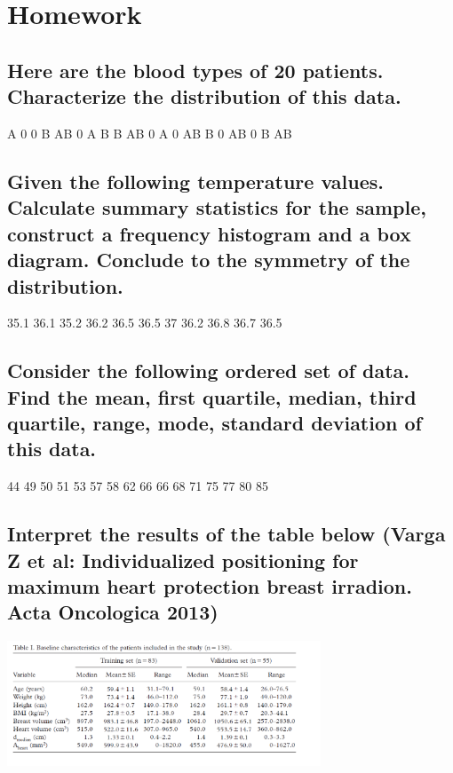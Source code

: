 \section{Homework}
\subsection{Here are the blood types of 20 patients. Characterize the distribution of this data.}
	\begin{center}A  0  0  B  AB  0  A  B  B  AB  0  A  0  AB  B  0  AB  0  B  AB\end{center}

\subsection{Given the following temperature values. Calculate summary statistics for the sample, construct a frequency histogram and a box diagram. Conclude to the symmetry of the distribution.}
	\begin{center}35.1  36.1  35.2  36.2  36.5  36.5  37  36.2  36.8  36.7  36.5\end{center}

	
\subsection{Consider the following ordered set of data. Find the mean, first quartile, median, third quartile, range, mode, standard deviation of this data.}
	\begin{center}44  49  50  51  53  57  58  62  66  66  68  71  75  77  80  85\end{center}

	
\subsection{Interpret the results of the table below (Varga Z et al: Individualized positioning for maximum heart protection breast irradion. Acta Oncologica 2013)}

	\begin{center}
	\includegraphics[width=0.7\textwidth]{Adat/02-continuous-table}
	\end{center}
